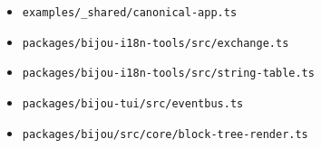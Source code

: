 \begin{itemize}
\tightlist
\item
  \texttt{e\allowbreak{}x\allowbreak{}a\allowbreak{}m\allowbreak{}p\allowbreak{}l\allowbreak{}e\allowbreak{}s\allowbreak{}/\allowbreak{}\_\allowbreak{}s\allowbreak{}h\allowbreak{}a\allowbreak{}r\allowbreak{}e\allowbreak{}d\allowbreak{}/\allowbreak{}c\allowbreak{}a\allowbreak{}n\allowbreak{}o\allowbreak{}n\allowbreak{}i\allowbreak{}c\allowbreak{}a\allowbreak{}l\allowbreak{}-\allowbreak{}a\allowbreak{}p\allowbreak{}p\allowbreak{}.\allowbreak{}t\allowbreak{}s}
\item
  \texttt{p\allowbreak{}a\allowbreak{}c\allowbreak{}k\allowbreak{}a\allowbreak{}g\allowbreak{}e\allowbreak{}s\allowbreak{}/\allowbreak{}b\allowbreak{}i\allowbreak{}j\allowbreak{}o\allowbreak{}u\allowbreak{}-\allowbreak{}i\allowbreak{}1\allowbreak{}8\allowbreak{}n\allowbreak{}-\allowbreak{}t\allowbreak{}o\allowbreak{}o\allowbreak{}l\allowbreak{}s\allowbreak{}/\allowbreak{}s\allowbreak{}r\allowbreak{}c\allowbreak{}/\allowbreak{}e\allowbreak{}x\allowbreak{}c\allowbreak{}h\allowbreak{}a\allowbreak{}n\allowbreak{}g\allowbreak{}e\allowbreak{}.\allowbreak{}t\allowbreak{}s}
\item
  \texttt{p\allowbreak{}a\allowbreak{}c\allowbreak{}k\allowbreak{}a\allowbreak{}g\allowbreak{}e\allowbreak{}s\allowbreak{}/\allowbreak{}b\allowbreak{}i\allowbreak{}j\allowbreak{}o\allowbreak{}u\allowbreak{}-\allowbreak{}i\allowbreak{}1\allowbreak{}8\allowbreak{}n\allowbreak{}-\allowbreak{}t\allowbreak{}o\allowbreak{}o\allowbreak{}l\allowbreak{}s\allowbreak{}/\allowbreak{}s\allowbreak{}r\allowbreak{}c\allowbreak{}/\allowbreak{}s\allowbreak{}t\allowbreak{}r\allowbreak{}i\allowbreak{}n\allowbreak{}g\allowbreak{}-\allowbreak{}t\allowbreak{}a\allowbreak{}b\allowbreak{}l\allowbreak{}e\allowbreak{}.\allowbreak{}t\allowbreak{}s}
\item
  \texttt{p\allowbreak{}a\allowbreak{}c\allowbreak{}k\allowbreak{}a\allowbreak{}g\allowbreak{}e\allowbreak{}s\allowbreak{}/\allowbreak{}b\allowbreak{}i\allowbreak{}j\allowbreak{}o\allowbreak{}u\allowbreak{}-\allowbreak{}t\allowbreak{}u\allowbreak{}i\allowbreak{}/\allowbreak{}s\allowbreak{}r\allowbreak{}c\allowbreak{}/\allowbreak{}e\allowbreak{}v\allowbreak{}e\allowbreak{}n\allowbreak{}t\allowbreak{}b\allowbreak{}u\allowbreak{}s\allowbreak{}.\allowbreak{}t\allowbreak{}s}
\item
  \texttt{p\allowbreak{}a\allowbreak{}c\allowbreak{}k\allowbreak{}a\allowbreak{}g\allowbreak{}e\allowbreak{}s\allowbreak{}/\allowbreak{}b\allowbreak{}i\allowbreak{}j\allowbreak{}o\allowbreak{}u\allowbreak{}/\allowbreak{}s\allowbreak{}r\allowbreak{}c\allowbreak{}/\allowbreak{}c\allowbreak{}o\allowbreak{}r\allowbreak{}e\allowbreak{}/\allowbreak{}b\allowbreak{}l\allowbreak{}o\allowbreak{}c\allowbreak{}k\allowbreak{}-\allowbreak{}t\allowbreak{}r\allowbreak{}e\allowbreak{}e\allowbreak{}-\allowbreak{}r\allowbreak{}e\allowbreak{}n\allowbreak{}d\allowbreak{}e\allowbreak{}r\allowbreak{}.\allowbreak{}t\allowbreak{}s}

\end{itemize}
